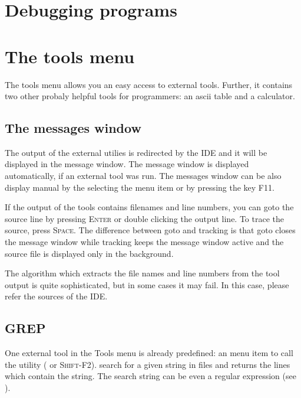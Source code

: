 \section{Debugging programs}
\label{se:debugging}

\section{The tools menu}
\label{se:toolsmenu}
The tools menu allows you an easy access to external tools. Further,
it contains two other probaly helpful tools for programmers: an
ascii table and a calculator.

\subsection{The messages window}
\label{se:toolsmessages}
The output of the external utilies is redirected by the IDE and it
will be displayed in the message window. The message window is
displayed automatically, if an external tool was run. The
messages window can be also display manual by the selecting the
menu item  or by pressing the key \textsc{F11}.

If the output of the tools contains filenames and line numbers,
you can goto the source line by pressing \textsc{Enter} or
double clicking the output line. To trace the source, press
\textsc{Space}. The difference between goto and tracking is that
goto closes the message window while tracking keeps the message
window active and the source file is displayed only in the background.

The algorithm which extracts the file names and line numbers from
the tool output is quite sophisticated, but in some cases it may
fail. In this case, please refer the sources of the IDE.

\subsection{GREP}
\label{se:grep}
One external tool in the Tools menu is already predefined: an
menu item to call the  utility ( or
\textsc{Shift-F2}).  search for a given string in files and
returns the lines which contain the string. The search string can
be even a regular expression (see ).

